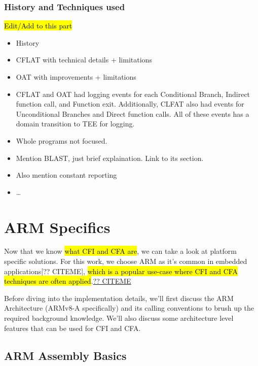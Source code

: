 \documentclass[a4paper, nobind]{templates/ociamthesis}
\providecommand{\tightlist}{%
  \setlength{\itemsep}{0pt}\setlength{\parskip}{0pt}}
\begin{document}
\subsubsection{History and Techniques used}\label{cfahistory}

\hl{Edit/Add to this part}

\begin{itemize}
\tightlist
\item
  History
\item
  CFLAT with technical details + limitations
\item
  OAT with improvements + limitations
\item
  CFLAT and OAT had logging events for each Conditional Branch, Indirect function call, and Function exit.
  Additionally, CLFAT also had events for Unconditional Branches and Direct function calls.
  All of these events has a domain transition to TEE for logging.
\item
  Whole programs not focused.
\item
  Mention BLAST, just brief explaination. Link to its section.
\item
  Also mention constant reporting
\item
  \ldots{}
\end{itemize}

\section{ARM Specifics}\label{arm-specifics}

Now that we know \hl{what CFI and CFA are}, we can take a look at platform specific solutions.
For this work, we choose ARM as it's common in embedded applications{[}?? CITEME{]},
\hl{which is a popular use-case where CFI and CFA techniques are often applied}.\href{}{?? CITEME}

Before diving into the implementation details, we'll first discuss the ARM Architecture
(ARMv8-A specifically) and its calling conventions to brush up the required background knowledge.
We'll also discuss some architecture level features that can be used for CFI and CFA.

\subsection{ARM Assembly Basics}\label{arm-assembly-basics}
\end{document}
